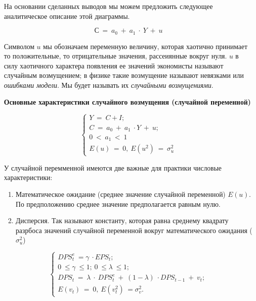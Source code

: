 \documentclass[12pt,a4paper]{article}
\begin{document}
На основании сделанных выводов мы можем предложить следующее аналитическое описание этой диаграммы.

\begin{equation*}
С\ =\ a_{0} \ +\ a_{1} \ \cdot \ Y\ +\ u
\end{equation*}

Символом $u$ мы обозначаем переменную величину, которая хаотично принимает то положительные, то отрицательные значения, рассеиянные вокруг нуля.
$u$ в силу хаотичного характера появления ее значений экономисты называют случайным возмущением; в физике такие возмущение называют невязками или \textit{ошибками модели}. Мы будет называть их \textit{случайными возмущениями}.
\begin{center}
\textbf{Основные характеристики случайного возмущения (случайной переменной)}
\end{center}


\begin{equation*}
\begin{cases}
Y\ =\ C+I;\\
C\ =\ a_{0} \ +\ a_{1} \ \cdot Y\ +\ u;\\
0\ < \ a_{1} \ < \ 1\\
E( u) \ =\ 0,\ E\left( u^{2}\right) \ =\ \sigma ^{2}_{u}
\end{cases}
\end{equation*}

У случайной перемменной имеются две важные для практики числовые характеристики:
\begin{enumerate}
\item Математическое ожидание (среднее значение случайной переменной) $E(u)$. По предположению среднее значение предполагается равным нулю.
\item Дисперсия. Так называют константу, которая равна среднему квадрату разрбоса значений случайной переменной вокруг математического ожидания ($\sigma^2_u$)
\end{enumerate}

\begin{equation*}
\begin{cases}
DPS^{e}_{t} \ =\gamma \ \cdot EPS_{t} ;\\
0\ \leq \gamma \ \leq 1;\ 0\ \leq \lambda \ \leq 1;\\
DPS_{t} \ =\ \lambda \ \cdot \ DPS^{e}_{t} \ +\ ( 1-\lambda ) \ \cdot DPS_{t-1} \ +\ v_{t} ;\\
E( v_{t}) \ =\ 0,\ E\left( v^{2}_{t}\right) \ =\sigma ^{2}_{v} .\
\end{cases}
\end{equation*}
\end{document}
